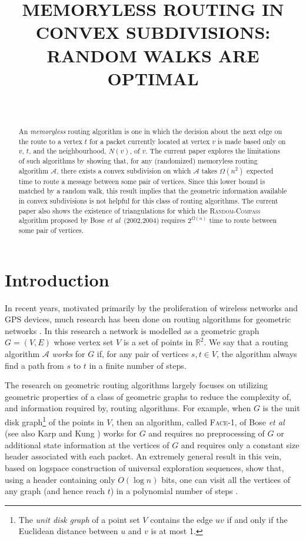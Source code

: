 \documentclass [letterpaper] {patmorin}
\title{\MakeUppercase{Memoryless Routing in Convex Subdivisions: \newline 
       Random Walks are Optimal}}
\author{\ }
\newcommand{\R}{\mathbb{R}}
\newcommand{\etal}{\emph{et al}}
\begin{document}
\maketitle

\begin{abstract}
An \emph{memoryless} routing algorithm is one in which the decision about
the next edge on the route to a vertex $t$ for a packet currently located
at vertex $v$ is made based only on $v$, $t$, and the neighbourhood,
$N(v)$, of $v$.  The current paper explores the limitations of such
algorithms by showing that, for any (randomized) memoryless routing
algorithm $\mathcal{A}$, there exists a convex subdivision on which
$\mathcal{A}$ takes $\Omega(n^2)$ expected time to route a message between
some pair of vertices.  Since this lower bound is matched by a random walk,
this result implies that the geometric information available in convex
subdivisions is not helpful for this class of routing algorithms.
The current paper also shows the existence of triangulations for which the
\textsc{Random-Compass} algorithm proposed by Bose \etal\ (2002,2004)
requires $2^{\Omega(n)}$ time to route between some pair of vertices.


\end{abstract}

\section{Introduction}
\label{sec:intro}

In recent years, motivated primarily by the proliferation of wireless networks and GPS devices, much research has been done on routing algorithms for geometric networks \cite{gior03}.  In this research a network is modelled as a geometric graph $G=(V,E)$ whose vertex set $V$ is a set of points in $\R^2$. We say that a routing algorithm $\mathcal{A}$ \emph{works} for $G$ if, for any pair of vertices $s,t\in V$, the algorithm always find a path from $s$ to $t$ in a finite number of steps.

The research on geometric routing algorithms largely focuses on utilizing geometric properties of a class of geometric graphs to reduce the complexity of, and information required by, routing algorithms.  For example, when $G$ is the unit disk graph\footnote{The \emph{unit disk graph} of a point set $V$ contains the edge $uv$ if and only if the Euclidean distance between $u$ and $v$ is at most 1.} of the points in $V$, then an algorithm, called \textsc{Face-1}, of Bose \etal\ \cite{bose01} (see also Karp and Kung \cite{kk00}) works for $G$ and requires no preprocessing of $G$ or additional state information at the vertices of $G$ and requires only a constant size header associated with each packet.  An extremely general result in this vein, based on logspace construction of universal exploration sequences, show that, using a header containing only $O(\log n)$ bits, one can visit all the vertices of any graph (and hence reach $t$) in a polynomial number of steps \cite{b08}.
\end{document}
